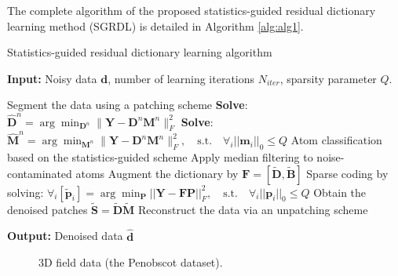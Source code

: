The complete algorithm of the proposed statistics-guided residual dictionary learning method (SGRDL) is detailed in Algorithm \ref{alg:alg1}.

\begin{algorithm}[htb!]
   \caption{Statistics-guided residual dictionary learning algorithm}
   \textbf{Input:} Noisy data $\mathbf{d}$, number of learning iterations $N_{iter}$, sparsity parameter $Q$.
    \begin{algorithmic}[1]
    \State Segment the data using a patching scheme
     \State \textbf{Solve}: $\hat{\mathbf{D}}^n = \arg\min_{\mathbf{D}^n} \parallel \mathbf{Y} - \mathbf{D}^n\mathbf{M}^n \parallel_F^2$
     \State \textbf{Solve}: $\hat{\mathbf{M}}^n = \arg\min_{\mathbf{M}^n} \parallel \mathbf{Y} - \mathbf{D}^n\mathbf{M}^n \parallel_F^2, \quad\text{s.t.}  \quad \forall_i ||\mathbf{m}_{i}||_{0}\le Q$
        \EndFor 
        \State Atom classification based on the statistics-guided scheme
        \State Apply median filtering to noise-contaminated atoms
        \State Augment the dictionary by $\mathbf{F} = [\tilde{\mathbf{D}}, \tilde{\mathbf{B}}]$
        \State Sparse coding by solving: $\forall_i [\tilde{\mathbf{p}}_{i}]=\arg\min_{\mathbf{P}}||\mathbf{Y}-\mathbf{F}\mathbf{P} ||^{2}_{F}, \quad\text{s.t.}  \quad \forall_i ||\mathbf{p}_{i}||_{0} \le Q$
        \State Obtain the denoised patches $\tilde{\mathbf{S}} = \tilde{\mathbf{D}} \tilde{\mathbf{M}}$
        \State Reconstruct the data via an unpatching scheme
\end{algorithmic}
   \textbf{Output:} Denoised data $\hat{\mathbf{d}}$
\label{alg:alg1}
\end{algorithm}





\begin{figure}[htb!]
\centering
{}
\caption{3D field data (the Penobscot dataset). }
\label{fig:p}
\end{figure}

